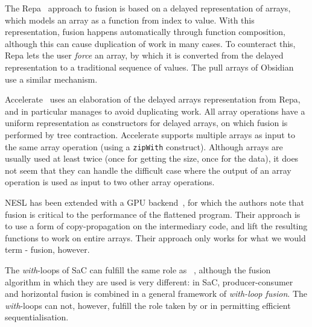 The Repa~\cite{keller2010regular} approach to fusion is based on a
delayed representation of arrays, which models an array as a function
from index to value.  With this representation, fusion happens
automatically through function composition, although this can cause
duplication of work in many cases.  To counteract this, Repa lets the
user {\em force} an array, by which it is converted from the
delayed representation to a traditional sequence of values.  The pull
arrays of Obsidian~\cite{claessen2012expressive} use a similar
mechanism.

Accelerate~\cite{mcdonell2013optimising} uses an elaboration of the
delayed arrays representation from Repa, and in particular manages to
avoid duplicating work.  All array operations have a uniform
representation as constructors for delayed arrays, on which fusion is
performed by tree contraction.  Accelerate supports multiple arrays as
input to the same array operation (using a \texttt{zipWith} construct).
Although arrays are usually used at least twice (once for getting the
size, once for the data), it does not seem that they can handle the difficult
case where the output of an array operation is used as input to two
other array operations.

NESL has been extended with a GPU backend~\cite{bergstrom2012nested},
for which the authors note that fusion is critical to the performance
of the flattened program.  Their approach is to use a form of
copy-propagation on the intermediary code, and lift the resulting
functions to work on entire arrays.  Their approach only works for
what we would term - fusion, however.

The \textit{with}-loops of SaC can fulfill the same role as
~\cite{Grelck:2005:WFD:2172471.2172483}, although the
fusion algorithm in which they are used is very different: in SaC,
producer-consumer and horizontal fusion is combined in a general
framework of \textit{with-loop fusion}.  The \textit{with}-loops can
not, however, fulfill the role taken by \StreamSeq{} or \StreamPar{}
in permitting efficient sequentialisation.


